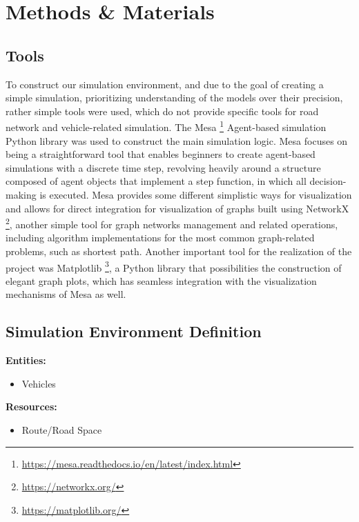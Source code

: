 \section{Methods \& Materials}
\label{sec:Methods-Materials}

\subsection{Tools}

To construct our simulation environment, and due to the goal of creating a simple simulation, prioritizing understanding of the models over their precision, rather simple tools were used, which do not provide specific tools for road network and vehicle-related simulation. The Mesa \footnote{\url{https://mesa.readthedocs.io/en/latest/index.html}} Agent-based simulation Python library was used to construct the main simulation logic. Mesa focuses on being a straightforward tool that enables beginners to create agent-based simulations with a discrete time step, revolving heavily around a structure composed of agent objects that implement a step function, in which all decision-making is executed. Mesa provides some different simplistic ways for visualization and allows for direct integration for visualization of graphs built using NetworkX \footnote{\url{https://networkx.org/}}, another simple tool for graph networks management and related operations, including algorithm implementations for the most common graph-related problems, such as shortest path. Another important tool for the realization of the project was Matplotlib \footnote{\url{https://matplotlib.org/}}, a Python library that possibilities the construction of elegant graph plots, which has seamless integration with the visualization mechanisms of Mesa as well.

\subsection{Simulation Environment Definition}

\textbf{Entities:}
\begin{itemize}
    \item Vehicles
\end{itemize}

\textbf{Resources:}
\begin{itemize}
    \item Route/Road Space
\end{itemize}

